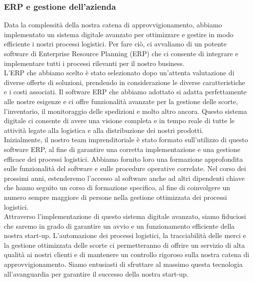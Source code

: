 \documentclass[12pt, a4paper]{article}
\newcommand{\meskip}{\medskip \\}
\begin{document}
\subsubsection{ERP e gestione dell'azienda}
Data la complessità della nostra catena di approvvigionamento, abbiamo implementato un sistema digitale avanzato per ottimizzare e gestire in modo efficiente i nostri processi logistici. Per fare ciò, ci avvaliamo di un potente software di Enterprise Resource Planning (ERP) che ci consente di integrare e implementare tutti i processi rilevanti per il nostro business.\meskip
L'ERP che abbiamo scelto è stato selezionato dopo un'attenta valutazione di diverse offerte di soluzioni, prendendo in considerazione le diverse caratteristiche e i costi associati. Il software ERP che abbiamo adottato si adatta perfettamente alle nostre esigenze e ci offre funzionalità avanzate per la gestione delle scorte, l'inventario, il monitoraggio delle spedizioni e molto altro ancora. Questo sistema digitale ci consente di avere una visione completa e in tempo reale di tutte le attività legate alla logistica e alla distribuzione dei nostri prodotti.\meskip
Inizialmente, il nostro team imprenditoriale è stato formato sull'utilizzo di questo software ERP, al fine di garantire una corretta implementazione e una gestione efficace dei processi logistici. Abbiamo fornito loro una formazione approfondita sulle funzionalità del software e sulle procedure operative correlate. Nel corso dei prossimi anni, estenderemo l'accesso al software anche ad altri dipendenti chiave che hanno seguito un corso di formazione specifico, al fine di coinvolgere un numero sempre maggiore di persone nella gestione ottimizzata dei processi logistici.\meskip
Attraverso l'implementazione di questo sistema digitale avanzato, siamo fiduciosi che saremo in grado di garantire un avvio e un funzionamento efficiente della nostra start-up. L'automazione dei processi logistici, la tracciabilità delle merci e la gestione ottimizzata delle scorte ci permetteranno di offrire un servizio di alta qualità ai nostri clienti e di mantenere un controllo rigoroso sulla nostra catena di approvvigionamento. Siamo entusiasti di sfruttare al massimo questa tecnologia all'avanguardia per garantire il successo della nostra start-up.
\end{document}
